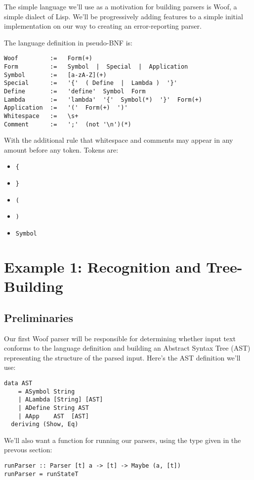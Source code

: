 \documentclass{tmr}
\begin{document}
The simple language we'll use as a motivation for building parsers is Woof, a 
simple dialect of Lisp.  We'll be progressively adding features to a simple 
initial implementation on our way to creating an error-reporting parser.

The language definition in pseudo-BNF \cite{bnf} is:

\begin{verbatim}
Woof         :=   Form(+)
Form         :=   Symbol  |  Special  |  Application
Symbol       :=   [a-zA-Z](+)
Special      :=   '{'  ( Define  |  Lambda )  '}'
Define       :=   'define'  Symbol  Form
Lambda       :=   'lambda'  '{'  Symbol(*)  '}'  Form(+)
Application  :=   '('  Form(+)  ')'
Whitespace   :=   \s+
Comment      :=   ';'  (not '\n')(*)
\end{verbatim}

With the additional rule that whitespace and comments may appear in any 
amount before any token.  Tokens are:
\begin{itemize}
  \item \verb+{+
  \item \verb+}+
  \item \verb+(+
  \item \verb+)+
  \item \verb+Symbol+
\end{itemize}




\section{Example 1: Recognition and Tree-Building}

\subsection{Preliminaries}
Our first Woof parser will be responsible for determining whether input
text conforms to the language definition and building an 
Abstract Syntax Tree (AST) representing the structure of the parsed input.
Here's the AST definition we'll use:
\begin{verbatim}
data AST
    = ASymbol String
    | ALambda [String] [AST]
    | ADefine String AST
    | AApp    AST  [AST]
  deriving (Show, Eq)
\end{verbatim}

We'll also want a function for running our parsers, using the type given in the
prevous section:
\begin{verbatim}
runParser :: Parser [t] a -> [t] -> Maybe (a, [t])
runParser = runStateT
\end{verbatim}
\end{document}

